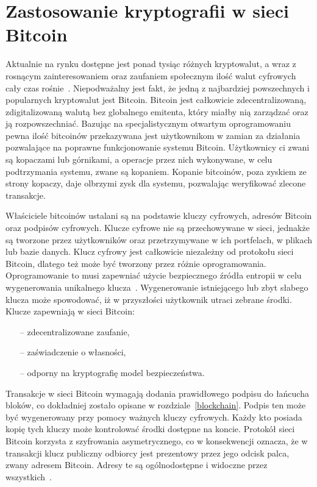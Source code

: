\documentclass[12pt, oneside, final, openany]{mgr}
\begin{document}
\section{Zastosowanie kryptografii w sieci Bitcoin} \label{sec:zastosowanieKryptografii}
\indent Aktualnie na rynku dostępne jest ponad tysiąc różnych kryptowalut, a wraz z rosnącym zainteresowaniem oraz zaufaniem społecznym ilość walut cyfrowych cały czas rośnie~\cite{Zcoinmarketcap, TheAgeOfCryptocurrency}. Niepodważalny jest fakt, że jedną z najbardziej powszechnych i popularnych kryptowalut jest Bitcoin. Bitcoin jest całkowicie zdecentralizowaną, zdigitalizowaną walutą bez globalnego emitenta, który miałby nią zarządzać oraz ją rozpowszechniać. Bazując na specjalistycznym otwartym oprogramowaniu pewna ilość bitcoinów przekazywana jest użytkownikom w zamian za działania pozwalające na poprawne funkcjonowanie systemu Bitcoin. Użytkownicy ci zwani są kopaczami lub górnikami, a operacje przez nich wykonywane, w celu podtrzymania systemu, zwane są kopaniem. Kopanie bitcoinów, poza zyskiem ze strony kopaczy, daje olbrzymi zysk dla systemu, pozwalając weryfikować zlecone transakcje.

\indent Właściciele bitcoinów ustalani są na podstawie kluczy cyfrowych, adresów Bitcoin oraz podpisów cyfrowych. Klucze cyfrowe nie są przechowywane w sieci, jednakże są tworzone przez użytkowników oraz przetrzymywane w ich portfelach, w plikach lub bazie danych. Klucz cyfrowy jest całkowicie niezależny od protokołu sieci Bitcoin, dlatego też może być tworzony przez różnie oprogramowania. Oprogramowanie to musi zapewniać użycie bezpiecznego źródła entropii w celu wygenerowania unikalnego klucza~\cite{Mastering, asychPrivateKey}. Wygenerowanie istniejącego lub zbyt słabego klucza może spowodować, iż w przyszłości użytkownik utraci zebrane środki. Klucze zapewniają w sieci Bitcoin:
\begin{itemize}
\item[--] zdecentralizowane zaufanie,
\item[--] zaświadczenie o własności,
\item[--] odporny na kryptografię model bezpieczeństwa.
\end{itemize}
Transakcje w sieci Bitcoin wymagają dodania prawidłowego podpisu do łańcucha bloków, co dokładniej zostało opisane w rozdziale~\ref{blockchain}. Podpis ten może być wygenerowany przy pomocy ważnych kluczy cyfrowych. Każdy kto posiada kopię tych kluczy może kontrolować środki dostępne na koncie. Protokół sieci Bitcoin korzysta z szyfrowania asymetrycznego, co w konsekwencji oznacza, że w transakcji klucz publiczny odbiorcy jest prezentowy przez jego odcisk palca, zwany adresem Bitcoin. Adresy te są ogólnodostępne i widoczne przez wszystkich~\cite{blockchaininfo}. 
\end{document}
